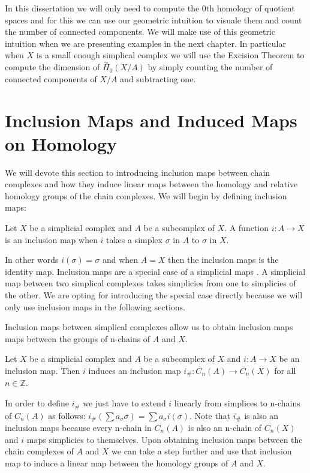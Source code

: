In this dissertation we will only need to compute the 0th homology of quotient spaces and for this we can use our geometric intuition to visuale them and count the number of connected components. We will make use of this geometric intuition when we are presenting examples in the next chapter. In particular when $X$ is a small enough simplical complex we will use the Excision Theorem to compute the dimension of $\overset{\sim}{H}_0(X/A)$ by simply counting the number of connected components of $X/A$ and subtracting one.


\section{Inclusion Maps and Induced Maps on Homology}


We will devote this section to introducing inclusion maps between chain complexes and how they induce linear maps between the homology and relative homology groups of the chain complexes. We will begin by defining inclusion maps:

\begin{defn} Let $X$ be a simplicial complex and $A$ be a subcomplex of $X$. A function $i: A \to X$ is an inclusion map when $i$ takes a simplex $\sigma$ in $A$ to $\sigma$ in $X$.
\end{defn}

In other words $i(\sigma) = \sigma$ and when $A = X$ then the inclusion maps is the identity map. Inclusion maps are a special case of a simplicial maps \cite{combinatorial-algebraic-topology}. A simplicial map between two simplical complexes takes simplicies from one to simplicies of the other. We are opting for introducing the special case directly because we will only use inclusion maps in the following sections.

Inclusion maps between simplical complexes allow us to obtain inclusion maps maps between the groups of n-chains of $A$ and $X$.

\begin{defn} Let $X$ be a simplicial complex and $A$ be a subcomplex of $X$ and $i: A \to X$ be an inclusion map. Then $i$ induces an inclusion map $i_\#: C_n(A) \to C_n(X)$ for all $n \in \mathbb{Z}$. \end{defn}

In order to define $i_\#$ we just have to extend $i$ linearly from simplices to n-chains of $C_n(A)$ as follows: $i_\#(\sum a_\sigma \sigma) = \sum a_\sigma i(\sigma)$. Note that $i_\#$ is also an inclusion maps because every n-chain in $C_n(A)$ is also an n-chain of $C_n(X)$ and $i$ maps simplicies to themselves. Upon obtaining inclusion maps between the chain complexes of $A$ and $X$ we can take a step further and use that inclusion map to induce a linear map between the homology groups of $A$ and $X$.

